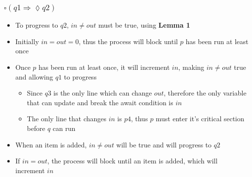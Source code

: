 \documentclass[12pt,a4paper]{article}
\begin{document}
\subsubsection*{$\square (q1 \Longrightarrow \lozenge q2)$}
\begin{itemize}
    \item To progress to $q2$, $in \neq out$ must be true, using \textbf{Lemma 1}
    \item Initially $in = out = 0$, thus the process will block until $p$ has been run at least once
    \item Once $p$ has been run at least once, it will increment $in$, making $in \neq out$ true and allowing $q1$ to progress
        \begin{itemize}
            \item Since $q3$ is the only line which can change $out$, therefore the only variable that can update and break the await condition is $in$
            \item The only line that changes $in$ is $p4$, thus $p$ must enter it's critical section before $q$ can run
        \end{itemize}
    \item When an item is added, $in \neq out$ will be true and will progress to $q2$
    \item If $in = out$, the process will block until an item is added, which will increment $in$
\end{itemize}
\end{document}
